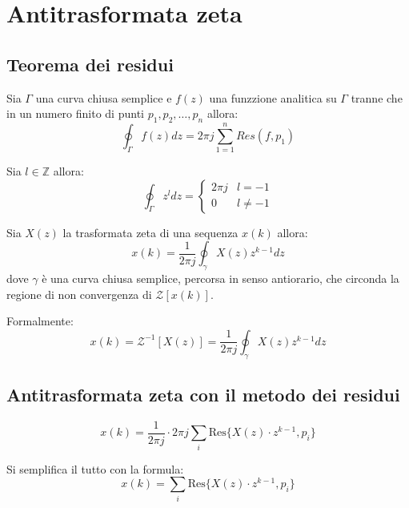 \section{Antitrasformata zeta}

\subsection{Teorema dei residui}

Sia $\Gamma$ una curva chiusa semplice e $f(z)$ una funzzione analitica su
$\Gamma$ tranne che in un numero finito di punti $p_1, p_2, \dots, p_n$ allora:
\begin{equation}
  \oint_{\Gamma} f(z) dz = 2 \pi j \sum_{1=1}^{n} Res(f, p_1)
\end{equation}

Sia $l \in \mathbb{Z}$ allora:
\begin{equation}
  \oint_{\Gamma} z^l dz = \begin{cases}
    2 \pi j & l = -1 \\
    0 & l \neq -1
    \end{cases}
\end{equation}

\begin{definition}
  Sia $X(z)$ la trasformata zeta di una sequenza $x(k)$ allora:
  \begin{equation}
    x(k) = \frac{1}{2\pi j} \oint_{\gamma} X(z) z^{k-1} dz
  \end{equation}
  dove $\gamma$ è una curva chiusa semplice, percorsa in senso antiorario, che
  circonda la regione di non convergenza di $\mathcal{Z}[x(k)]$.

  Formalmente:
  \begin{equation}
    x(k) = \mathcal{Z}^{-1}[X(z)] = \frac{1}{2\pi j} \oint_{\gamma} X(z) z^{k-1} dz
  \end{equation}
\end{definition}


\subsection{Antitrasformata zeta con il metodo dei residui}

\begin{equation}
  x(k) = \frac{1}{2 \pi j} \cdot 2 \pi j \sum_{i} \text{Res}\{ X(z) \cdot z^{k-1}, p_i \}
\end{equation}

Si semplifica il tutto con la formula:
\begin{equation}
  x(k) = \sum_{i} \text{Res}\{ X(z) \cdot z^{k-1}, p_i \}
\end{equation}


